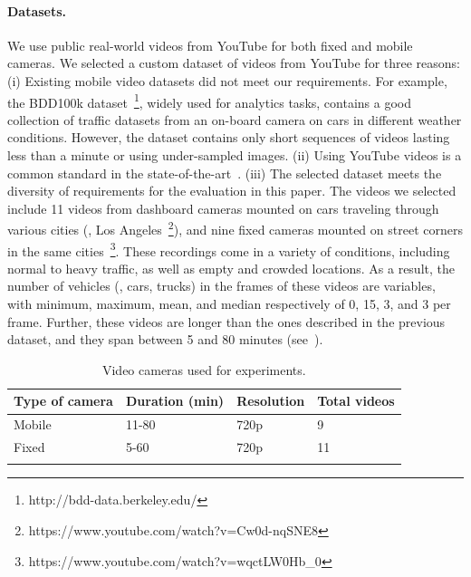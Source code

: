 \paragraph{Datasets.}
We use public real-world videos from YouTube for both fixed and mobile cameras. We selected a custom dataset of videos from YouTube for three reasons: (i) Existing mobile video datasets did not meet our requirements. For example, the BDD100k dataset~\footnote{http://bdd-data.berkeley.edu/}, widely used for analytics tasks, contains a good collection of traffic datasets from an on-board camera on cars in different weather conditions. However, the dataset contains only short sequences of videos lasting less than a minute or using under-sampled images. (ii) Using YouTube videos is a common standard in the state-of-the-art~\cite{zeng2020distream,zhang2022batch,lai2021top,wang2020surveiledge,elgamal2020sieve}. (iii) The selected dataset meets the diversity of requirements for the evaluation in this paper. The videos we selected include 11 videos from dashboard cameras mounted on cars traveling through various cities (\eg, Los Angeles~\footnote{https://www.youtube.com/watch?v=Cw0d-nqSNE8}), and nine fixed cameras mounted on street corners in the same cities~\footnote{https://www.youtube.com/watch?v=wqctLW0Hb\_0}. These recordings come in a variety of conditions, including normal to heavy traffic, as well as empty and crowded locations. As a result, the number of vehicles (\eg, cars, trucks) in the frames of these videos are variables, with minimum, maximum, mean, and median respectively of 0, 15, 3, and 3 per frame. Further, these videos are longer than the ones described in the previous dataset, and they span between 5 and 80 minutes (see~).

\begin{table}
	\centering
	\begin{tabular}{p{1.9cm}p{1.9cm}p{1.7cm}p{1.7cm}}
	\toprule
	\textbf{Type of camera} & \textbf{Duration (min)} & \textbf{Resolution} & \textbf{Total videos} \\
	\midrule
	Mobile        & 11-80                                                                                                     & 720p                & 9                      \\
	Fixed         & 5-60                                                                                                      & 720p                & 11                     \\
	\bottomrule
	\addlinespace        
	\end{tabular}
	\caption{Video cameras used for experiments.}
	\label{tab:dataset}
\end{table}